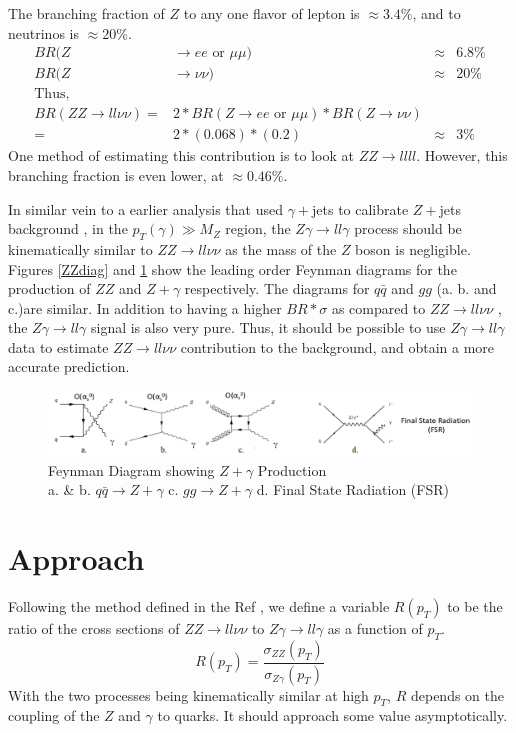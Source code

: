 \documentclass[11pt,a4paper,final]{report}
\newcommand{\ZZ}{$ZZ\rightarrow ll\nu\nu$ }
\newcommand{\Zgam}{$Z\gamma\rightarrow ll\gamma$ }
\begin{document}
The branching fraction of $Z$ to any one flavor of lepton is $\approx 3.4\%$, and to neutrinos is $\approx 20\%$.
\begin{align*}
	BR(Z&\rightarrow ee \text{ or } \mu\mu) &\approx& 6.8\% \\
	BR(Z&\rightarrow \nu\nu) &\approx& 20\% \\
\text{Thus},\\
	BR(ZZ\rightarrow ll\nu\nu) =& 2*BR(Z\rightarrow ee\text{ or }\mu\mu)*BR(Z\rightarrow \nu\nu)\\
	 =& 2*(0.068)*(0.2) &\approx& 3\%
\end{align*}
One method of estimating this contribution is to look at $ZZ\rightarrow llll$. However, this branching fraction is even lower, at $\approx 0.46 \%$.

In similar vein to a earlier analysis that used $\gamma+$jets to calibrate $Z+$jets background \cite{gammajet}, in the $p_T(\gamma) \gg M_Z$ region, the \Zgam process should be kinematically similar to \ZZ as the mass of the $Z$ boson is negligible. Figures \ref{ZZdiag} and \ref{Zgdiag} show the leading order Feynman diagrams for the production of $ZZ$ and $Z+\gamma$ respectively. The diagrams for $q\bar{q}$ and $gg$ (a. b. and c.)are similar. In addition to having a higher $BR*\sigma$ as compared to \ZZ, the \Zgam signal is also very pure. Thus, it should be possible to use \Zgam data to estimate \ZZ contribution to the background, and obtain a more accurate prediction.
\begin{figure}[h]
	\begin{center}
		\includegraphics[width=\linewidth]{Zg.png}
		\captionsetup{justification=centering}
		\caption{Feynman Diagram showing $Z+\gamma$ Production\hfill \\ a. \& b. $q\bar{q}\rightarrow Z+\gamma$ \hfill c. $gg\rightarrow Z+\gamma$ \hfill d. Final State Radiation (FSR)}
		\label{Zgdiag}
	\end{center}
\end{figure}

\section{Approach}
Following the method defined in the Ref \cite{gammajet}, we define a variable $R(p_T)$ to be the ratio of the cross sections of \ZZ to \Zgam as a function of $p_T$.
\begin{equation}
	R(p_{T}) = \frac{\sigma_{ZZ}(p_{T})}{\sigma_{Z\gamma}(p_T)}
\end{equation}
With the two processes being kinematically similar at high $p_T$, $R$ depends on the coupling of the $Z$ and $\gamma$ to quarks. It should approach some value asymptotically.
\end{document}
